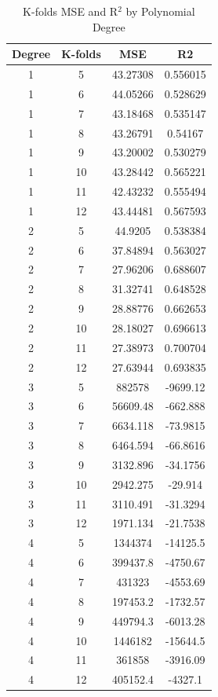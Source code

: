 \documentclass[conference, 11pt]{IEEEtran}
\begin{document}
\begin{table}[htbp]
  \centering
  \caption{K-folds MSE and R$^2$ by Polynomial Degree}
    \begin{tabular}{cccc}
    \toprule
   Degree & K-folds & MSE & R2 \\
    \midrule
    1     & 5     & 43.27308 & 0.556015 \\
    1     & 6     & 44.05266 & 0.528629 \\
    1     & 7     & 43.18468 & 0.535147 \\
    1     & 8     & 43.26791 & 0.54167 \\
    1     & 9     & 43.20002 & 0.530279 \\
    1     & 10    & 43.28442 & 0.565221 \\
    1     & 11    & 42.43232 & 0.555494 \\
    1     & 12    & 43.44481 & 0.567593 \\
    \hline
    2     & 5     & 44.9205 & 0.538384 \\
    2     & 6     & 37.84894 & 0.563027 \\
    2     & 7     & 27.96206 & 0.688607 \\
    2     & 8     & 31.32741 & 0.648528 \\
    2     & 9     & 28.88776 & 0.662653 \\
    2     & 10    & 28.18027 & 0.696613 \\
    2     & 11    & 27.38973 & 0.700704 \\
    2     & 12    & 27.63944 & 0.693835 \\
    \hline
    3     & 5     & 882578 & -9699.12 \\
    3     & 6     & 56609.48 & -662.888 \\
    3     & 7     & 6634.118 & -73.9815 \\
    3     & 8     & 6464.594 & -66.8616 \\
    3     & 9     & 3132.896 & -34.1756 \\
    3     & 10    & 2942.275 & -29.914 \\
    3     & 11    & 3110.491 & -31.3294 \\
    3     & 12    & 1971.134 & -21.7538 \\
    \hline
    4     & 5     & 1344374 & -14125.5 \\
    4     & 6     & 399437.8 & -4750.67 \\
    4     & 7     & 431323 & -4553.69 \\
    4     & 8     & 197453.2 & -1732.57 \\
    4     & 9     & 449794.3 & -6013.28 \\
    4     & 10    & 1446182 & -15644.5 \\
    4     & 11    & 361858 & -3916.09 \\
    4     & 12    & 405152.4 & -4327.1 \\
    \bottomrule
    \end{tabular}%
  \label{tab:kfolds2}%
\end{table}%
\end{document}
